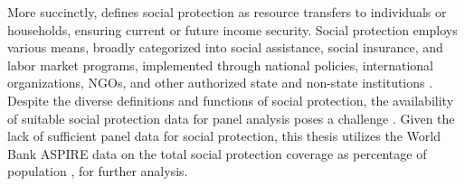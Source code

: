 More succinctly, \textcite{midgley_advanced_2022} defines social protection as resource transfers to individuals or households, ensuring current or future income security. Social protection employs various means, broadly categorized into social assistance, social insurance, and labor market programs, implemented through national policies, international organizations, NGOs, and other authorized state and non-state institutions \parencite{holzmann_social_2001, midgley_advanced_2022, yokobori_roles_2023}. Despite the diverse definitions and functions of social protection, the availability of suitable social protection data for panel analysis poses a challenge \parencite{nino-zarazua_aids_2023}. Given the lack of sufficient panel data for social protection, this thesis utilizes the World Bank ASPIRE data on the total social protection coverage as percentage of population \parencite{wdi_world_2023}, for further analysis.



